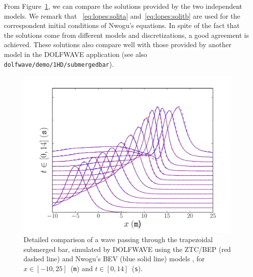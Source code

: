From Figure~\ref{fig:lopes:zhaonwogu}, we can compare the
solutions provided by the two independent models.  We remark
that ~\eqref{eq:lopes:solita}
and~\eqref{eq:lopes:solitb} are used for the correspondent initial
conditions of Nwogu's equations.
In spite of the fact that  the solutions come from different
models and discretizations, a good agreement  is achieved.
These solutions also compare well with those provided by
another model in the DOLFWAVE application (see also {\tt
  dolfwave/demo/1HD/submergedbar}).

\begin{figure}
  \begin{center}
    \includegraphics[width=\largefig]{chapters/lopes/pdf/ZhaoNwogu.pdf}
  \end{center}
  \caption{Detailed comparison of a wave passing through the
    trapezoidal submerged bar,
    simulated by DOLFWAVE  using the ZTC/BEP (red dashed line) and
    Nwogu's BEV (blue solid line) models , for
    $x\in[-10,25]$~({\tt m}) and $t\in[0,14]$~({\tt s}).}
  \label{fig:lopes:zhaonwogu}
\end{figure}

